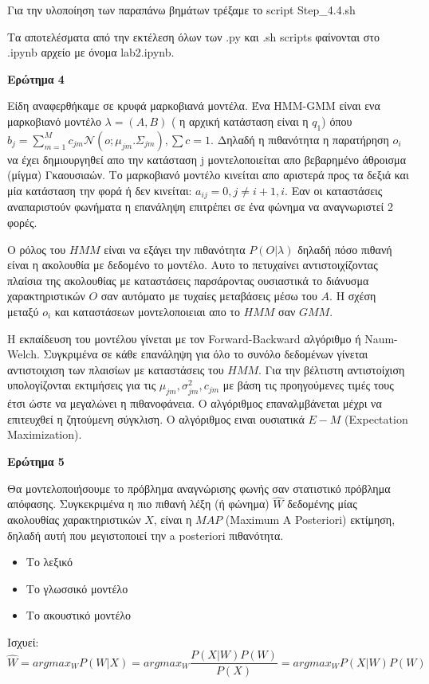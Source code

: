 \documentclass[12pt]{article}
\begin{document}
Για την υλοποίηση των παραπάνω βημάτων τρέξαμε το script Step\_4.4.sh 

Τα αποτελέσματα από την εκτέλεση όλων των .py και .sh scripts φαίνονται στο .ipynb αρχείο με όνομα lab2.ipynb.


\textbf{Ερώτημα 4}

Είδη αναφερθήκαμε σε κρυφά μαρκοβιανά μοντέλα. Ένα HMM-GMM είναι ενα μαρκοβιανό μοντέλο $λ = (Α,B)$ ( η αρχική κατάσταση είναι η $q_1$) όπου $b_j = \sum_{m=1}^M c_{jm} \mathcal{N}(ο;μ_{jm}. Σ_{jm}), \sum c = 1$. Δηλαδή η πιθανότητα η παρατήρηση $ο_i$ να έχει δημιουργηθεί απο την κατάσταση j μοντελοποιείται απο βεβαρημένο άθροισμα (μίγμα) Γκαουσιαών. Το μαρκοβιανό μοντέλο κινείται απο αριστερά προς τα δεξιά και μία κατάσταση την φορά ή δεν κινείται: $a_{ij} = 0, j \neq i+1,i$. Εαν οι καταστάσεις αναπαριστούν φωνήματα η επανάληψη επιτρέπει σε ένα φώνημα να αναγνωριστεί 2 φορές. 

Ο ρόλος του $HMM$ είναι να εξάγει την πιθανότητα $P(O|λ)$ δηλαδή πόσο πιθανή είναι η ακολουθία με δεδομένο το μοντέλο. Αυτο το πετυχαίνει αντιστοιχίζοντας πλαίσια της ακολουθίας με καταστάσεις παρσάροντας ουσιαστικά το διάνυσμα χαρακτηριστικών $O$ σαν αυτόματο με τυχαίες μεταβάσεις μέσω του $A$. Η σχέση μεταξύ $o_i$ και καταστάσεων μοντελοποιειαι απο το $HMM$ σαν $GMM$. 

Η εκπαίδευση του μοντέλου γίνεται με τον Forward-Backward αλγόριθμο ή Naum-Welch. Συγκριμένα σε κάθε επανάληψη για όλο το συνόλο δεδομένων γίνεται αντιστοιχιση των πλαισίων με καταστάσεις του $HMM$. Για την βέλτιστη αντιστοίχιση υπολογίζονται εκτιμήσεις για τις $μ_{jm},σ_{jm}^2,c_{jm}$ με βάση τις προηγούμενες τιμές τους έτσι ώστε να μεγαλώνει η πιθανοφάνεια. Ο αλγόριθμος επαναλμβάνεται μέχρι να επιτευχθεί η ζητούμενη σύγκλιση.  Ο αλγόριθμος ειναι ουσιατικά $Ε-M$ (Expectation Maximization).  


\textbf{Ερώτημα 5}

Θα μοντελοποιήσουμε το πρόβλημα αναγνώρισης φωνής σαν στατιστικό πρόβλημα απόφασης. Συγκεκριμένα η πιο πιθανή λέξη (ή φώνημα) $\hat{W}$ δεδομένης μίας ακολουθίας χαρακτηριστικών $X$, είναι η $MAP$ (Maximum A Posteriori) εκτίμηση, δηλαδή αυτή που μεγιστοποιεί την a posteriori πιθανότητα. 
\begin{itemize}
    \item Το λεξικό
    \item Το γλωσσικό μοντέλο  
    \item Το ακουστικό μοντέλο
\end{itemize}
Ισχυεί:
$$ \hat{W} = arg max_W P(W|X) = arg max_W \frac{P(X|W)P(W)}{P(X)} = arg max_W P(X|W)P(W) $$  
\end{document}
